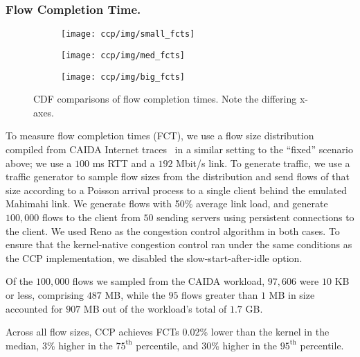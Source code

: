 \subsubsection{Flow Completion Time.}
\label{sec:eval:fidelity:fct}

\begin{figure}[t]
\centering
\begin{subfigure}{\columnwidth}
\texttt{[image: ccp/img/small\_fcts]}
\label{fig:eval:fidelity:fct:sml}
\end{subfigure}
%
\begin{subfigure}{\columnwidth}
\texttt{[image: ccp/img/med\_fcts]}
\label{fig:eval:fidelity:fct:med}
\end{subfigure}
%
\begin{subfigure}{\columnwidth}
\texttt{[image: ccp/img/big\_fcts]}
\label{fig:eval:fidelity:fct:big}
\end{subfigure}
%
\caption{CDF comparisons of flow completion times. Note the differing x-axes.}\label{fig:eval:fidelity:fct}
\end{figure}

To measure flow completion times (FCT), we use a flow size distribution compiled from CAIDA Internet traces~\cite{caida} in a similar setting to the ``fixed'' scenario above; we use a $100$ ms RTT and a $192$ Mbit/s link.
To generate traffic, we use a traffic generator to sample flow sizes from the distribution and send flows of that size according to a Poisson  arrival process to a single client behind the emulated Mahimahi link. We generate flows with 50\% average link load, and generate $100,000$ flows to the client from $50$ sending servers using persistent connections to the client.
We used Reno as the congestion control algorithm in both cases. To ensure that the kernel-native congestion control ran under the same conditions as the CCP implementation, we disabled the slow-start-after-idle option.

Of the $100,000$ flows we sampled from the CAIDA workload, $97,606$ were $10$ KB or less, comprising $487$ MB, while the $95$ flows greater than $1$ MB in size accounted for $907$ MB out of the workload's total of $1.7$ GB.

Across all flow sizes, CCP achieves FCTs 0.02\% lower than the kernel in the median, 3\% higher in the $75^{\text{th}}$ percentile, and $30$\% higher in the $95^{\text{th}}$ percentile.

